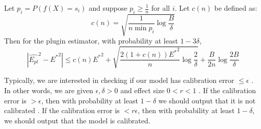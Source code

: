 
\begin{theorem}
\label{thm:plugin-bound}
Let $p_i = P(f(X) = s_i)$ and suppose $p_i \geq \frac{1}{n}$ for all $i$. Let $c(n)$ be defined as:
\[ c(n) = \sqrt{\frac{1}{n \min p_i} \log{\frac{B}{\delta}}} \]
Then for the plugin estimator, with probability at least $1 - 3\delta$,
\[ | \hat{E_{pl}}^2 - {E^*}^2 | \leq c(n){E^*}^2 + \sqrt{\frac{2(1+c(n)){E^*}^2}{n} \log{\frac{2}{\delta}}} + \frac{B}{2n} \log{\frac{2B}{\delta}} \]
\end{theorem}




Typically, we are interested in checking if our model has calibration error $\leq \epsilon$ .  In other words, we are given $\epsilon, \delta > 0$ and effect size $0 < r < 1$ . If the calibration error is $> \epsilon$, then with probability at least $1 - \delta$ we should output that it is not calibrated . If the calibration error is $< r\epsilon$, then with probability at least $1 - \delta$, we should output that the model is calibrated.

